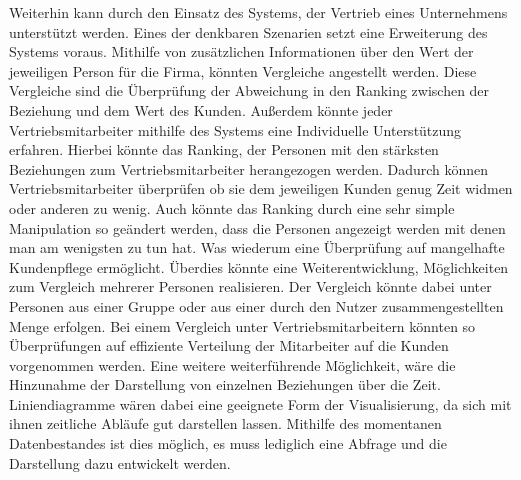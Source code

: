 Weiterhin kann durch den Einsatz des Systems, der Vertrieb eines Unternehmens unterstützt werden. Eines der denkbaren Szenarien setzt eine Erweiterung des Systems voraus. Mithilfe von zusätzlichen Informationen über den Wert der jeweiligen Person für die Firma, könnten Vergleiche angestellt werden. Diese Vergleiche sind die Überprüfung der Abweichung in den Ranking zwischen der Beziehung und dem Wert des Kunden.
Außerdem könnte jeder Vertriebsmitarbeiter mithilfe des Systems eine Individuelle Unterstützung erfahren. Hierbei könnte das Ranking, der Personen mit den stärksten Beziehungen zum Vertriebsmitarbeiter herangezogen werden. Dadurch können Vertriebsmitarbeiter überprüfen ob sie dem jeweiligen Kunden genug Zeit widmen oder anderen zu wenig. Auch könnte das Ranking durch eine sehr simple Manipulation so geändert werden, dass die Personen angezeigt werden mit denen man am wenigsten zu tun hat. Was wiederum eine Überprüfung auf mangelhafte Kundenpflege ermöglicht. 
Überdies könnte eine Weiterentwicklung, Möglichkeiten zum Vergleich mehrerer Personen realisieren. Der Vergleich könnte dabei unter Personen aus einer Gruppe oder aus einer durch den Nutzer zusammengestellten Menge erfolgen. Bei einem Vergleich unter Vertriebsmitarbeitern könnten so Überprüfungen auf effiziente Verteilung der Mitarbeiter auf die Kunden vorgenommen werden.
Eine weitere weiterführende Möglichkeit, wäre die Hinzunahme der Darstellung von einzelnen Beziehungen über die Zeit. Liniendiagramme wären dabei eine geeignete Form der Visualisierung, da sich mit ihnen zeitliche Abläufe gut darstellen lassen. Mithilfe des momentanen Datenbestandes ist dies möglich, es muss lediglich eine Abfrage und die Darstellung dazu entwickelt werden.  
